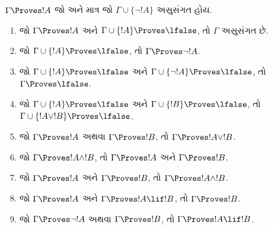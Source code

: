 \begin{prop} $\Gamma \Proves !A$ જો અને માત્ર જો
$\Gamma\cup \{\lnot!A \}$ અસુસંગત હોય. \end{prop}

\begin{prop} \begin{enumerate}
\item {} જો $\Gamma \Proves !A$ અને $\Gamma
\cup \{ !A\} \Proves \lfalse$, તો $\Gamma$ અસુસંગત છે.

\item {} જો $\Gamma \cup \{!A\}
\Proves \lfalse$, તો $\Gamma \Proves \lnot !A$.

\item {} જો $\Gamma \cup \{!A\}
\Proves \lfalse$ અને $\Gamma \cup \{\lnot !A\} \Proves
\lfalse$, તો $\Gamma \Proves \lfalse$.

\item {} જો $\Gamma \cup \{!A\}
\Proves \lfalse$ અને $\Gamma \cup \{!B\} \Proves
\lfalse$, તો $\Gamma \cup \{!A \lor !B\} \Proves \lfalse$.

\item {} જો $\Gamma
\Proves !A$ અથવા $\Gamma \Proves !B$, તો $\Gamma
\Proves !A \lor !B$.

\item {} જો $\Gamma
\Proves !A \land !B$, તો $\Gamma \Proves !A$ અને
$\Gamma \Proves !B$.

\item {} જો $\Gamma
\Proves !A$ અને $\Gamma \Proves !B$, તો $\Gamma
\Proves !A \land !B$.

\item {} જો $\Gamma \Proves
!A$ અને $\Gamma \Proves !A \lif !B$, તો $\Gamma
\Proves !B$.

\item {} જો $\Gamma \Proves
\lnot !A$ અથવા $\Gamma \Proves !B$, તો $\Gamma \Proves
!A \lif !B$. \end{enumerate} \end{prop}

